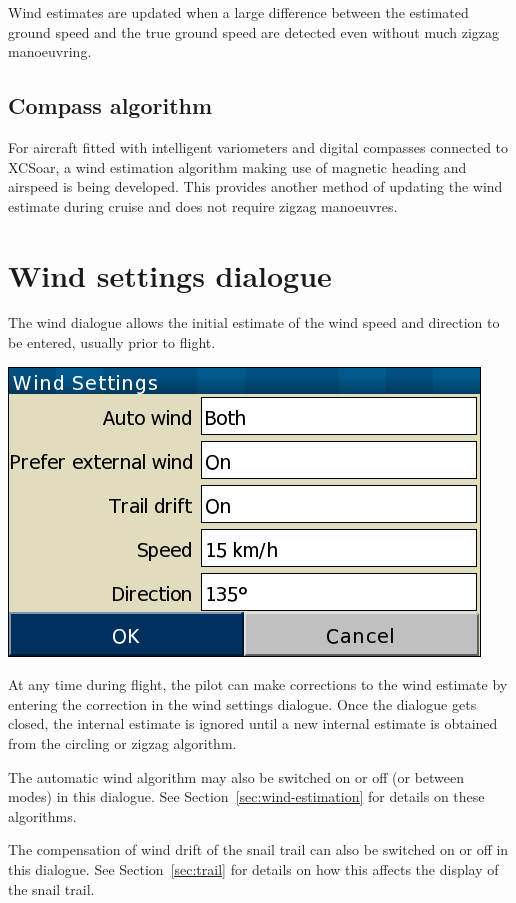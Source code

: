 Wind estimates are updated when a large difference between the
estimated ground speed and the true ground speed are detected even
without much zigzag manoeuvring.

\subsection*{Compass algorithm}

For aircraft fitted with intelligent variometers and digital compasses
connected to XCSoar, a wind estimation algorithm making use of
magnetic heading and airspeed is being developed.  This provides
another method of updating the wind estimate during cruise and does
not require zigzag manoeuvres.

\section{Wind settings dialogue}\label{sec:wind-setup}

The wind dialogue allows the initial estimate of the wind speed and
direction to be entered, usually prior to flight.

\begin{center}
\includegraphics[angle=0,width=0.4\linewidth,keepaspectratio='true']{figures/dialog-wind2.png}
\end{center}

At any time during flight, the pilot can make corrections to the wind
estimate by entering the correction in the wind settings dialogue.  Once the
dialogue gets closed, the internal estimate is ignored until a new internal
estimate is obtained from the circling or zigzag algorithm.

The automatic wind algorithm may also be switched on or off (or
between modes) in this dialogue.  See Section~\ref{sec:wind-estimation}
for details on these algorithms.

The compensation of wind drift of the snail trail can also be switched
on or off in this dialogue.  See Section~\ref{sec:trail} for details on
how this affects the display of the snail trail.

